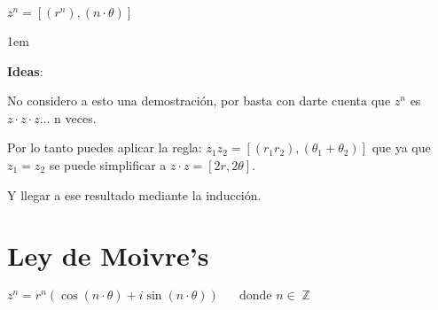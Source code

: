 \documentclass[12pt, fleqn]{report}                             %
\newenvironment{SmallIndentation}[1][0.75em]                    %
    {\begin{adjustwidth}{#1}{}\begin{footnotesize}}                 %
    {\end{footnotesize}\end{adjustwidth}}                           %
\DeclareMathOperator \Space {\quad}                             %
\newcommand{\Wrap}[1]{\left( #1 \right)}                        %
\DeclareMathOperator \Integers  {\mathbb{Z}}                     %
\newcommand{\Cos}[1]{\cos\Wrap{#1}}                             %
\newcommand{\Sin}[1]{\sin\Wrap{#1}}                             %
\newcommand \Cis[1]  {\Cos{#1} + i \Sin{#1}}                    %
\begin{document}
\begin{itemize}
                    $z^n = [(r^n), (n \cdot \theta)]$

                    \begin{SmallIndentation}[1em]
                        \textbf{Ideas}:

                        No considero a esto una demostración, por basta con darte cuenta que
                        $z^n$ es $z \cdot z \cdot z \dots$ n veces.

                        Por lo tanto puedes aplicar la regla: $z_1z_2 = [(r_1r_2), (\theta_1 + \theta_2)]$
                        que ya que $z_1 = z_2$ se puede simplificar a $z \cdot z = [2r, 2\theta]$.

                        Y llegar a ese resultado mediante la inducción.

                    \end{SmallIndentation}

            \clearpage
            

            \end{itemize}


        \clearpage
        \section{Ley de Moivre's}

            $z^n = r^n \Wrap{\Cis{n \cdot \theta}} \Space \text{donde } n \in \Integers$
            
\end{document}
